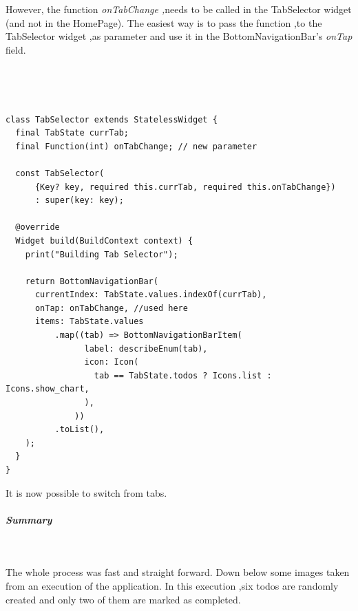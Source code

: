  However, the function  \textit{onTabChange ,}needs to be called in the TabSelector widget (and not in the HomePage). The easiest way is to pass the function ,to the TabSelector widget ,as parameter and use it in the BottomNavigationBar's \textit{onTap }field.


\mbox{}\\
\begin{code}
\mbox{}\\

\label{code:2.30}
\begin{verbatim}
class TabSelector extends StatelessWidget {
  final TabState currTab;
  final Function(int) onTabChange; // new parameter

  const TabSelector(
      {Key? key, required this.currTab, required this.onTabChange})
      : super(key: key);

  @override
  Widget build(BuildContext context) {
    print("Building Tab Selector");

    return BottomNavigationBar(
      currentIndex: TabState.values.indexOf(currTab),
      onTap: onTabChange, //used here
      items: TabState.values
          .map((tab) => BottomNavigationBarItem(
                label: describeEnum(tab),
                icon: Icon(
                  tab == TabState.todos ? Icons.list : Icons.show_chart,
                ),
              ))
          .toList(),
    );
  }
}

\end{verbatim}
\end{code}

It is now possible to switch from tabs.


\subparagraph{Summary}\mbox{}\\
\label{subpar:todo_app_inherited_widget_summary}

The whole process was fast and straight forward. Down below some images taken from an execution of the application. In this execution ,six todos are randomly created and only two of them are marked as completed. 

